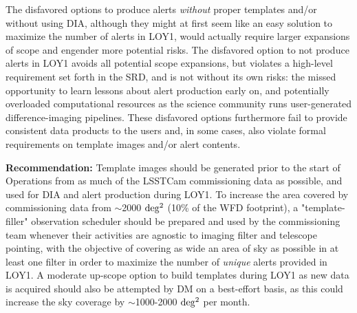 \documentclass[DM,lsstdraft,toc]{lsstdoc}
\begin{document}
The disfavored options to produce alerts {\it without} proper templates and/or without using DIA, although they might at first seem like an easy solution to maximize the number of alerts in LOY1, would actually require larger expansions of scope and engender more potential risks. The disfavored option to not produce alerts in LOY1 avoids all potential scope expansions, but violates a high-level requirement set forth in the SRD, and is not without its own risks: the missed opportunity to learn lessons about alert production early on, and potentially overloaded computational resources as the science community runs user-generated difference-imaging pipelines. These disfavored options furthermore fail to provide consistent data products to the users and, in some cases, also violate formal requirements on template images and/or alert contents.

{\bf Recommendation:} Template images should be generated prior to the start of Operations from as much of the LSSTCam commissioning data as possible, and used for DIA and alert production during LOY1. To increase the area covered by commissioning data from $\sim$2000 $\rm deg^2$ (10\% of the WFD footprint), a "template-filler" observation scheduler should be prepared and used by the commissioning team whenever their activities are agnostic to imaging filter and telescope pointing, with the objective of covering as wide an area of sky as possible in at least one filter in order to maximize the number of {\em unique} alerts provided in LOY1. A moderate up-scope option to build templates during LOY1 as new data is acquired should also be attempted by DM on a best-effort basis, as this could increase the sky coverage by $\sim$1000-2000 $\rm deg^2$ per month.




\clearpage





\end{document}
